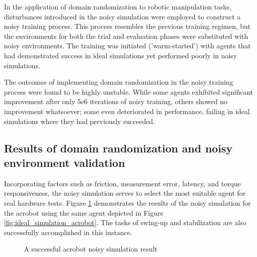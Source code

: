 In the application of domain randomization to robotic manipulation tasks, disturbances introduced in the noisy simulation were employed to construct a noisy training process. This process resembles the previous training regimen, but the environments for both the trial and evaluation phases were substituted with noisy environments. The training was initiated ('warm-started') with agents that had demonstrated success in ideal simulations yet performed poorly in noisy simulations.

The outcomes of implementing domain randomization in the noisy training process were found to be highly unstable. While some agents exhibited significant improvement after only 5e6 iterations of noisy training, others showed no improvement whatsoever; some even deteriorated in performance, failing in ideal simulations where they had previously succeeded.

\subsection{Results of domain randomization and noisy environment validation}
Incorporating factors such as friction, measurement error, latency, and torque responsiveness, the noisy simulation serves to select the most suitable agent for real hardware tests. Figure \ref{fig:noisy_simulation_acrobot} demonstrates the results of the noisy simulation for the acrobot using the same agent depicted in Figure \ref{fig:ideal_simulation_acrobot}. The tasks of swing-up and stabilization are also successfully accomplished in this instance. 

\begin{figure}[H]
    \centering
    \caption{A successful acrobot noisy simulation result}
    \label{fig:noisy_simulation_acrobot}
\end{figure}

